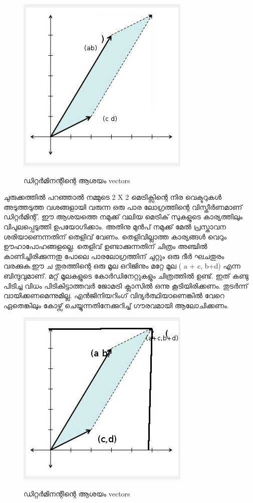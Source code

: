\documentclass[10pt,a4paper]{report}
\begin{document}
                        
    \begin{figure}[H]
  \center
\includegraphics[scale=.5]{images/m3}
\label{mat3}
\caption{ ഡിറ്റർമിനന്റിന്റെ  ആശയം vectors }
\end{figure}
   
    ചുരുക്കത്തിൽ പറഞ്ഞാൽ നമ്മുടെ 2 X 2 മെട്രിക്സിന്റെ നിര വെക്ടറുകൾ അടുത്തടുത്ത വശങ്ങളായി വരുന്ന ഒരു പാര ലോഗ്രത്തിന്റെ വിസ്തീർണമാണ് ഡിറ്റർമിന്റ്. ഈ ആശയത്തെ നമുക്ക് വലിയ മെട്രിക് സുകളുടെ കാര്യത്തിലും വിപുലപ്പെടുത്തി ഉപയോഗിക്കാം. അതിനു മുൻപ് നമുക്ക് മേൽ പ്രസ്താവന ശരിയാണെന്നതിന് തെളിവ് വേണം. തെളിവില്ലാത്ത കാര്യങ്ങൾ വെറും ഊഹാപോഹങ്ങളല്ലെ. തെളിവ് ഉണ്ടാക്കുന്നതിന് ചിത്രം അഞ്ചിൽ കാണിച്ചിരിക്കുന്നതു പോലെ പാരലോഗ്രത്തിന് ചുറ്റും ഒരു ദീർ ഘചതുരം വരക്കുക.ഈ ച തുരത്തിന്റെ ഒരു മൂല ഒറിജിനും മറ്റേ മൂല ( a + c, b+d) എന്ന ബിന്ദുവുമാണ്. മറ്റ് മൂലകളുടെ കോർഡിനേറ്റുകളും ചിത്രത്തിൽ ഉണ്ട്. ഇത് കണ്ടു പിടിച്ച വിധം പിടികിട്ടാത്തവർ ജോമട്രി ക്ലാസിൽ ഒന്നു കൂടിയിരിക്കണം. തുടർന്ന് വായിക്കണമെന്നുമില്ല. എൻജിനിയറിംഗ് വിദ്യർത്ഥിയാണെങ്കിൽ വേറെ ഏതെങ്കിലും കോഴ്സ് ചെയ്യുന്നതിനേക്കുറിച്ച് ഗൗരവമായി ആലോചിക്കണം.
                           
    \begin{figure}[H]
  \center
\includegraphics[scale=.5]{images/m4}
\label{mat4}
\caption{ ഡിറ്റർമിനന്റിന്റെ  ആശയം vectors }
\end{figure}
                           
\end{document}
